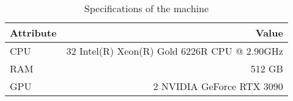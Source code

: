 \begin{table}[H]
	\caption{Specifications of the machine}
	\label{tab:training-specs}
	\centering
	\begin{tabular}{l|r}
		Attribute & Value\\\hline
		CPU & 32 Intel(R) Xeon(R) Gold 6226R CPU @ 2.90GHz\\
		RAM &512 GB\\
		GPU & 2 NVIDIA GeForce RTX 3090
	\end{tabular}
\end{table}